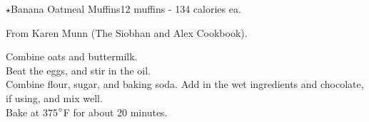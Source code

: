 \begin{recipe}{\texorpdfstring{$\star$}{str}Banana Oatmeal Muffins}{12 muffins - 134 calories ea.}{}

    \freeform From Karen Munn (The Siobhan and Alex Cookbook).


    Combine oats and buttermilk.\\

    Beat the eggs, and stir in the oil.\\

    Combine flour, sugar, and baking soda. Add in the wet ingredients and chocolate, if using, and mix well.\\

    Bake at 375$\degree$F for about 20 minutes.

\end{recipe}